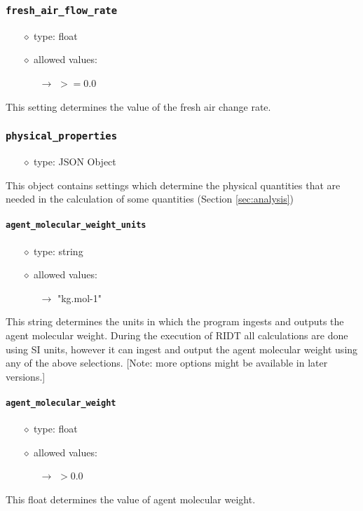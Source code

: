 \documentclass[]{article}
\def\code#1{\texttt{#1}}
\begin{document}
\subsubsection{\code{fresh\_air\_flow\_rate}}\label{sec:freshairchangerate}
\begin{itemize}
    \item[$\diamond$] type: float 
    \item[$\diamond$] allowed values:
    \begin{itemize}
        \item[$\rightarrow$] $>=0.0$
    \end{itemize}
\end{itemize}
This setting determines the value of the fresh air change rate.

\subsubsection{\code{physical\_properties}}
\begin{itemize}
    \item[$\diamond$] type: JSON Object 
\end{itemize}
This object contains settings which determine the physical quantities that are
needed in the calculation of some quantities (Section \ref{sec:analysis})

\paragraph{\code{agent\_molecular\_weight\_units}}\label{sec:agentmolweightunits}
\begin{itemize}
    \item[$\diamond$] type: string 
    \item[$\diamond$] allowed values:
    \begin{itemize}
        \item[$\rightarrow$] "kg.mol-1"
    \end{itemize}
\end{itemize}
This string determines the units in which the program ingests and outputs the
agent molecular weight. During the execution of RIDT all calculations are done
using SI units, however it can ingest and output the agent molecular weight
using any of the above selections. [Note: more options might be available in
later versions.]

\paragraph{\code{agent\_molecular\_weight}}\label{sec:agentmolweight}
\begin{itemize}
    \item[$\diamond$] type: float 
    \item[$\diamond$] allowed values:
    \begin{itemize}
        \item[$\rightarrow$] $>0.0$ 
    \end{itemize}
\end{itemize}
This float determines the value of agent molecular weight.
\end{document}
